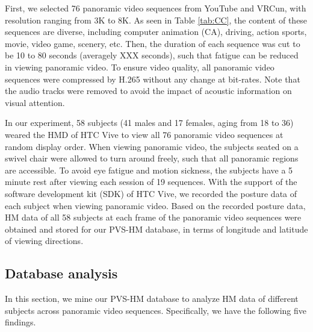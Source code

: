\documentclass[10pt,journal,compsoc]{IEEEtran}
\begin{document}
First, we selected 76 panoramic video sequences from YouTube and VRCun, with resolution ranging from 3K to 8K.
As seen in Table \ref{tab:CC}, the content of these sequences are diverse, including computer animation (CA), driving, action sports, movie, video game, scenery, etc.
Then, the duration of each sequence was cut to be 10 to 80 seconds (averagely XXX seconds), such that fatigue can be reduced in viewing panoramic video.
To ensure video quality, all panoramic video sequences were compressed by H.265 \cite{Sullivan2013Overview} without any change at bit-rates.
Note that the audio tracks were removed to avoid the impact of acoustic information on visual attention.

In our experiment, 58 subjects (41 males and 17 females, aging from 18 to 36) weared the HMD of HTC Vive to view all 76 panoramic video sequences at random display order.
When viewing panoramic video, the subjects seated on a swivel chair were allowed to turn around freely, such that all panoramic regions are accessible.
To avoid eye fatigue and motion sickness, the subjects have a 5 minute rest after viewing each session of 19 sequences.
With the support of the software development kit (SDK) of HTC Vive, we recorded the posture data of each subject when viewing panoramic video.
Based on the recorded posture data, HM data of all 58 subjects at each frame of the panoramic video sequences were obtained and stored for our PVS-HM database, in terms of longitude and latitude of viewing directions.

\subsection{Database analysis}
\label{Database_analysis}

In this section, we mine our PVS-HM database to analyze HM data of different subjects across panoramic video sequences.
Specifically, we have the following five findings.
\end{document}
